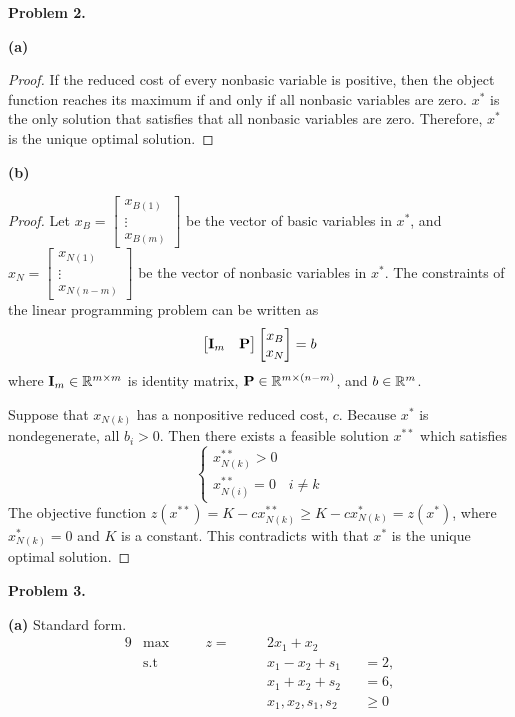 \documentclass[12pt]{article}
\begin{document}
\vspace{\baselineskip}
\noindent
\textbf{Problem 2.}

\noindent
\textbf{(a)} 
\begin{proof}
If the reduced cost of every nonbasic variable is positive, then the object function reaches its maximum if and only if all nonbasic variables are zero. $x^*$ is the only solution that satisfies that all nonbasic variables are zero. Therefore, $x^*$ is the unique optimal solution.
\end{proof}

\noindent
\textbf{(b)}
\begin{proof}
Let $ x_B = \begin{bmatrix} x_{B(1)} \\ \vdots \\ x_{B(m)} \end{bmatrix} $ be the vector of basic variables in $x^*$, and $ x_N = \begin{bmatrix} x_{N(1)} \\ \vdots \\ x_{N(n-m)} \end{bmatrix} $ be the vector of nonbasic variables in $x^*$.
The constraints of the linear programming problem can be written as
\[
\begin{bmatrix} \mathbf{I}_{m} & \mathbf{P} \end{bmatrix} \begin{bmatrix} x_B \\ x_N \end{bmatrix} = b
\]
where $\mathbf{I}_{m} \in \mathbb{R}^{m\times m}$ is identity matrix, $\mathbf{P} \in \mathbb{R}^{m\times (n-m)}$, and $b \in \mathbb{R}^{m}$.

Suppose that $x_{N(k)}$ has a nonpositive reduced cost, $c$. Because $x^*$ is nondegenerate, all $b_i > 0$. Then there exists a feasible solution $x^{**}$ which satisfies
\[
\begin{cases}
x^{**}_{N(k)} > 0 \\
x^{**}_{N(i)} = 0 & i \ne k
\end{cases}
\]
The objective function $z(x^{**}) = K - cx^{**}_{N(k)} \ge K - cx^{*}_{N(k)} = z(x^{*})$, where $x^{*}_{N(k)} = 0$ and $K$ is a constant. This contradicts with that $x^*$ is the unique optimal solution.
\end{proof}

\noindent
\textbf{Problem 3.}

\noindent
\textbf{(a)}
Standard form.
\begin{alignat*}{9}
    &\text{max} \quad && z = \quad && 2x_1 + x_2         &&       \\
    &\text{s.t}       &&           && x_1 - x_2 + s_1    && = 2, \\
    &                 &&           && x_1 + x_2 + s_2    && = 6, \\
    &                 &&           && x_1, x_2, s_1, s_2 &&\ge 0
\end{alignat*}
\end{document}
